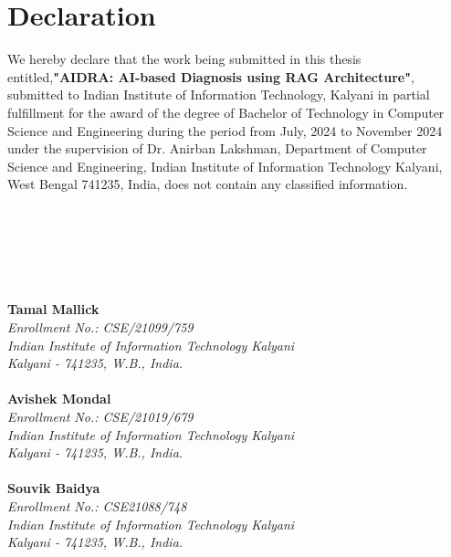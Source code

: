 \documentclass[12pt,a4paper]{report}
\newcommand{\mytitle}{AIDRA: AI-based Diagnosis using RAG Architecture}
\begin{document}
	\chapter*{\centering Declaration}
\label{sec:engack}
We hereby declare that the work being submitted in this thesis entitled,\textbf{"\mytitle "}, submitted to Indian Institute of Information Technology, Kalyani in partial fulfillment for the award of the degree of Bachelor of Technology in Computer Science and Engineering during the period from July, 2024 to November 2024 under the supervision of Dr. Anirban Lakshman, Department of Computer Science and Engineering, Indian Institute of Information Technology Kalyani, West Bengal 741235, India, does not contain any classified information. 
\\
\\
\\
\\
\\
\\
\\
\noindent
\textbf{Tamal Mallick} \\
\textit{Enrollment No.: CSE/21099/759 \\
Indian Institute of Information Technology Kalyani \\
Kalyani - 741235, W.B., India.} \\[1em]
\\[1.2cm]
\noindent
\textbf{Avishek Mondal} \\
\textit{Enrollment No.: CSE/21019/679 \\
Indian Institute of Information Technology Kalyani \\
Kalyani - 741235, W.B., India.} \\[1em]
\\[1.2cm]
\noindent
\textbf{Souvik Baidya} \\
\textit{Enrollment No.: CSE21088/748 \\
Indian Institute of Information Technology Kalyani \\
Kalyani - 741235, W.B., India.}

\cleardoublepage
	
			\newpage
\end{document}
